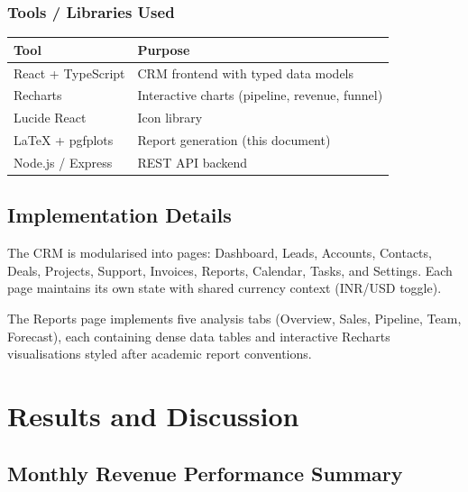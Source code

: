 \documentclass[12pt,a4paper]{report}
\begin{document}
\subsection{Tools / Libraries Used}

\begin{center}
\begin{tabular}{L{3.5cm} L{8.5cm}}
\toprule
\textbf{Tool} & \textbf{Purpose} \\
\midrule
React + TypeScript & CRM frontend with typed data models \\
Recharts & Interactive charts (pipeline, revenue, funnel) \\
Lucide React & Icon library \\
\LaTeX{} + pgfplots & Report generation (this document) \\
Node.js / Express & REST API backend \\
\bottomrule
\end{tabular}
\end{center}

\section{Implementation Details}

The CRM is modularised into pages: Dashboard, Leads, Accounts, Contacts, Deals, Projects, Support, Invoices, Reports, Calendar, Tasks, and Settings. Each page maintains its own state with shared currency context (INR/USD toggle).

The Reports page implements five analysis tabs (Overview, Sales, Pipeline, Team, Forecast), each containing dense data tables and interactive Recharts visualisations styled after academic report conventions.

\chapter{Results and Discussion}

\section{Monthly Revenue Performance Summary}
\end{document}
